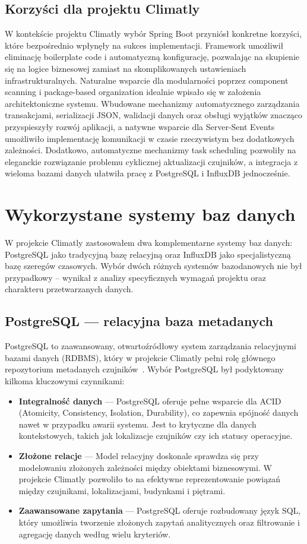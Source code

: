 \documentclass[a4paper,12pt,openany]{book}
\begin{document}
\subsection*{Korzyści dla projektu Climatly}

W kontekście projektu Climatly wybór Spring Boot przyniósł konkretne korzyści, które bezpośrednio wpłynęły na sukces implementacji. Framework umożliwił eliminację boilerplate code i automatyczną konfigurację, pozwalając na skupienie się na logice biznesowej zamiast na skomplikowanych ustawieniach infrastrukturalnych. Naturalne wsparcie dla modularności poprzez component scanning i package-based organization idealnie wpisało się w założenia architektoniczne systemu. Wbudowane mechanizmy automatycznego zarządzania transakcjami, serializacji JSON, walidacji danych oraz obsługi wyjątków znacząco przyspieszyły rozwój aplikacji, a natywne wsparcie dla Server-Sent Events umożliwiło implementację komunikacji w czasie rzeczywistym bez dodatkowych zależności. Dodatkowo, automatyczne mechanizmy task scheduling pozwoliły na eleganckie rozwiązanie problemu cyklicznej aktualizacji czujników, a integracja z wieloma bazami danych ułatwiła pracę z PostgreSQL i InfluxDB jednocześnie.

\section{Wykorzystane systemy baz danych}
W projekcie Climatly zastosowałem dwa komplementarne systemy baz danych: PostgreSQL jako tradycyjną bazę relacyjną oraz InfluxDB jako specjalistyczną bazę szeregów czasowych. Wybór dwóch różnych systemów bazodanowych nie był przypadkowy – wynikał z analizy specyficznych wymagań projektu oraz charakteru przetwarzanych danych.
\subsection*{PostgreSQL --- relacyjna baza metadanych}
PostgreSQL to zaawansowany, otwartoźródłowy system zarządzania relacyjnymi bazami danych (RDBMS), który w projekcie Climatly pełni rolę głównego repozytorium metadanych czujników~\cite{bib:aws2023postgresql}. Wybór PostgreSQL był podyktowany kilkoma kluczowymi czynnikami:

\begin{itemize}
  \item \textbf{Integralność danych} --- PostgreSQL oferuje pełne wsparcie dla ACID (Atomicity, Consistency, Isolation, Durability), co zapewnia spójność danych nawet w przypadku awarii systemu. Jest to krytyczne dla danych kontekstowych, takich jak lokalizacje czujników czy ich statusy operacyjne.
  \item \textbf{Złożone relacje} --- Model relacyjny doskonale sprawdza się przy modelowaniu złożonych zależności między obiektami biznesowymi. W projekcie Climatly pozwoliło to na efektywne reprezentowanie powiązań między czujnikami, lokalizacjami, budynkami i piętrami.
  \item \textbf{Zaawansowane zapytania} --- PostgreSQL oferuje rozbudowany język SQL, który umożliwia tworzenie złożonych zapytań analitycznych oraz filtrowanie i agregację danych według wielu kryteriów.
\end{itemize}
\end{document}
